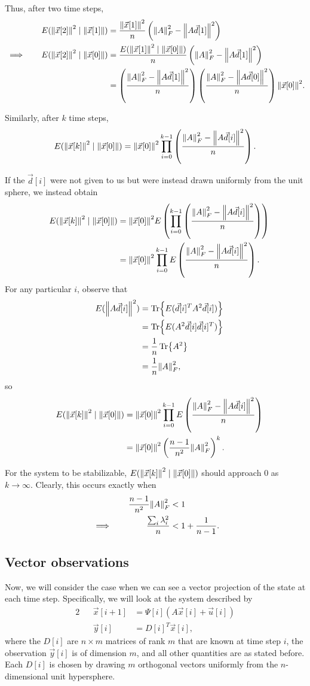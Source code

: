 \documentclass[letterpaper]{article}
\theoremstyle{remark}
\newcommand{\eqn}[1]{\begin{alignat*}{2}#1\end{alignat*}}
\newcommand*{\thus}{&\implies\quad&}
\begin{document}
Thus, after two time steps,
\eqn{
    && E(\norm{\vec{x}[2]}^2 \mid \norm{\vec{x}[1]}) &= \frac{\norm{\vec{x}[1]}^2}{n} \left(\norm{A}^2_F - \norm{A\vec{d}[1]}^2\right) \\
    \thus E(\norm{\vec{x}[2]}^2 \mid \norm{\vec{x}[0]}) &= \frac{E(\norm{\vec{x}[1]}^2 \mid \norm{\vec{x}[0]})}{n} \left(\norm{A}^2_F - \norm{A\vec{d}[1]}^2\right) \\
    &&&= \left(\frac{\norm{A}^2_F - \norm{A\vec{d}[1]}^2}{n}\right)\left(\frac{\norm{A}^2_F - \norm{A\vec{d}[0]}^2}{n}\right) \norm{\vec{x}[0]}^2.
}

Similarly, after $k$ time steps,
\[
    E(\norm{\vec{x}[k]}^2 \mid \norm{\vec{x}[0]}) = \norm{\vec{x}[0]}^2 \prod_{i=0}^{k-1} \left(\frac{\norm{A}^2_F - \norm{A\vec{d}[i]}^2}{n}\right).
\]

If the $\vec{d}[i]$ were not given to us but were instead drawn uniformly from the unit sphere, we instead obtain
\eqn{
    && E(\norm{\vec{x}[k]}^2 \mid \norm{\vec{x}[0]}) &= \norm{\vec{x}[0]}^2 E\left(\prod_{i=0}^{k-1} \left(\frac{\norm{A}^2_F - \norm{A\vec{d}[i]}^2}{n}\right)\right) \\
    &&&= \norm{\vec{x}[0]}^2 \prod_{i=0}^{k-1} E\left(\frac{\norm{A}^2_F - \norm{A\vec{d}[i]}^2}{n}\right).
}
For any particular $i$, observe that
\eqn{
    && E(\norm{A\vec{d}[i]}^2) &= \Tr{E(\vec{d}[i]^TA^2\vec{d}[i])} \\
    &&&= \Tr{E(A^2\vec{d}[i]\vec{d}[i]^T)} \\
    &&&= \frac{1}{n}\Tr{A^2} \\
    &&&= \frac{1}{n}\norm{A}^2_F,
}
so
\eqn{
    && E(\norm{\vec{x}[k]}^2 \mid \norm{\vec{x}[0]}) &= \norm{\vec{x}[0]}^2 \prod_{i=0}^{k-1} E\left(\frac{\norm{A}^2_F - \norm{A\vec{d}[i]}^2}{n}\right) \\
    &&&= \norm{\vec{x}[0]}^2 \left(\frac{n - 1}{n^2} \norm{A}^2_F\right)^{k}.
}

For the system to be stabilizable, $E(\norm{\vec{x}[k]}^2 \mid \norm{\vec{x}[0]})$ should approach $0$ as $k \to \infty$. Clearly, this occurs exactly when
\eqn{
    && \frac{n - 1}{n^2} \norm{A}^2_F &< 1 \\
    \thus \frac{\sum_i \lambda_i^2}{n} &< 1 + \frac{1}{n - 1}.
}

\subsection*{Vector observations}
Now, we will consider the case when we can see a vector projection of the state at each time step. Specifically, we will look at the system described by
\eqn{
    && \vec{x}[i + 1] &= \Psi[i](A\vec{x}[i] + \vec{u}[i]) \\
    && \vec{y}[i] &= D[i]^T \vec{x}[i],
}
where the $D[i]$ are $n \times m$ matrices of rank $m$ that are known at time step $i$, the observation $\vec{y}[i]$ is of dimension $m$, and all other quantities are as stated before. Each $D[i]$ is chosen by drawing $m$ orthogonal vectors uniformly from the $n$-dimensional unit hypersphere.
\end{document}
